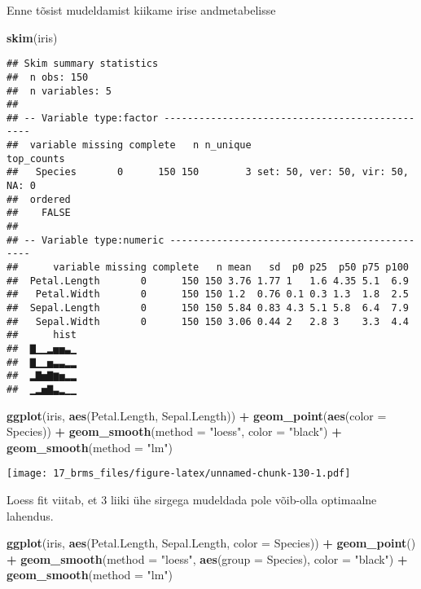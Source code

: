 \documentclass[]{article}
\newenvironment{Shaded}{\begin{snugshade}}{\end{snugshade}}
\newcommand{\KeywordTok}[1]{\textcolor[rgb]{0.13,0.29,0.53}{\textbf{#1}}}
\newcommand{\DataTypeTok}[1]{\textcolor[rgb]{0.13,0.29,0.53}{#1}}
\newcommand{\StringTok}[1]{\textcolor[rgb]{0.31,0.60,0.02}{#1}}
\newcommand{\OperatorTok}[1]{\textcolor[rgb]{0.81,0.36,0.00}{\textbf{#1}}}
\newcommand{\NormalTok}[1]{#1}
\begin{document}
Enne tõsist mudeldamist kiikame irise andmetabelisse

\begin{Shaded}
\begin{Highlighting}[]
\KeywordTok{skim}\NormalTok{(iris)}
\end{Highlighting}
\end{Shaded}

\begin{verbatim}
## Skim summary statistics
##  n obs: 150 
##  n variables: 5 
## 
## -- Variable type:factor -----------------------------------------------
##  variable missing complete   n n_unique                       top_counts
##   Species       0      150 150        3 set: 50, ver: 50, vir: 50, NA: 0
##  ordered
##    FALSE
## 
## -- Variable type:numeric ----------------------------------------------
##      variable missing complete   n mean   sd  p0 p25  p50 p75 p100
##  Petal.Length       0      150 150 3.76 1.77 1   1.6 4.35 5.1  6.9
##   Petal.Width       0      150 150 1.2  0.76 0.1 0.3 1.3  1.8  2.5
##  Sepal.Length       0      150 150 5.84 0.83 4.3 5.1 5.8  6.4  7.9
##   Sepal.Width       0      150 150 3.06 0.44 2   2.8 3    3.3  4.4
##      hist
##  ▇▁▁▂▅▅▃▁
##  ▇▁▁▅▃▃▂▂
##  ▂▇▅▇▆▅▂▂
##  ▁▂▅▇▃▂▁▁
\end{verbatim}

\begin{Shaded}
\begin{Highlighting}[]
\KeywordTok{ggplot}\NormalTok{(iris, }\KeywordTok{aes}\NormalTok{(Petal.Length, Sepal.Length)) }\OperatorTok{+}\StringTok{ }
\StringTok{  }\KeywordTok{geom_point}\NormalTok{(}\KeywordTok{aes}\NormalTok{(}\DataTypeTok{color =}\NormalTok{ Species)) }\OperatorTok{+}
\StringTok{  }\KeywordTok{geom_smooth}\NormalTok{(}\DataTypeTok{method =} \StringTok{"loess"}\NormalTok{, }\DataTypeTok{color =} \StringTok{"black"}\NormalTok{) }\OperatorTok{+}
\StringTok{  }\KeywordTok{geom_smooth}\NormalTok{(}\DataTypeTok{method =} \StringTok{"lm"}\NormalTok{)}
\end{Highlighting}
\end{Shaded}

\texttt{[image: 17\_brms\_files/figure-latex/unnamed-chunk-130-1.pdf]}

Loess fit viitab, et 3 liiki ühe sirgega mudeldada pole võib-olla
optimaalne lahendus.

\begin{Shaded}
\begin{Highlighting}[]
\KeywordTok{ggplot}\NormalTok{(iris, }\KeywordTok{aes}\NormalTok{(Petal.Length, Sepal.Length, }\DataTypeTok{color =}\NormalTok{ Species)) }\OperatorTok{+}\StringTok{ }
\StringTok{  }\KeywordTok{geom_point}\NormalTok{() }\OperatorTok{+}
\StringTok{  }\KeywordTok{geom_smooth}\NormalTok{(}\DataTypeTok{method =} \StringTok{"loess"}\NormalTok{, }\KeywordTok{aes}\NormalTok{(}\DataTypeTok{group =}\NormalTok{ Species), }\DataTypeTok{color =} \StringTok{"black"}\NormalTok{) }\OperatorTok{+}
\StringTok{  }\KeywordTok{geom_smooth}\NormalTok{(}\DataTypeTok{method =} \StringTok{"lm"}\NormalTok{)}
\end{Highlighting}
\end{Shaded}
\end{document}
